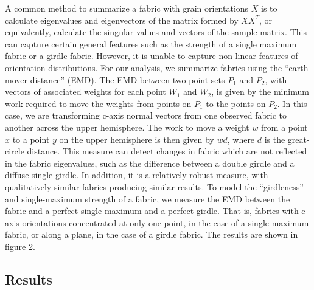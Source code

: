 \documentclass{igs}
\begin{document}
A common method to summarize a fabric with grain orientations $X$ is to calculate eigenvalues and eigenvectors of the matrix formed by $X X^T$, or equivalently, calculate the singular values and vectors of the sample matrix. This can capture certain general features such as the strength of a single maximum fabric or a girdle fabric. However, it is unable to capture non-linear features of orientation distributions. For our analysis, we summarize fabrics using the ``earth mover distance'' (EMD). The EMD between two point sets $P_1$ and $P_2$, with vectors of associated weights for each point $W_1$ and $W_2$, is given by the minimum work required to move the weights from points on $P_1$ to the points on $P_2$. In this case, we are transforming c-axis normal vectors from one observed fabric to another across the upper hemisphere. The work to move a weight $w$ from a point $x$ to a point $y$ on the upper hemisphere is then given by ${wd}$, where $d$ is the great-circle distance. This measure can detect changes in fabric which are not reflected in the fabric eigenvalues, such as the difference between a double girdle and a diffuse single girdle. In addition, it is a relatively robust measure, with qualitatively similar fabrics producing similar results. To model the ``girdleness'' and single-maximum strength of a fabric, we measure the EMD between the fabric and a perfect single maximum and a perfect girdle. That is, fabrics with c-axis orientations concentrated at only one point, in the case of a single maximum fabric, or along a plane, in the case of a girdle fabric. The results are shown in figure 2. 


\subsection{Results}
\end{document}
